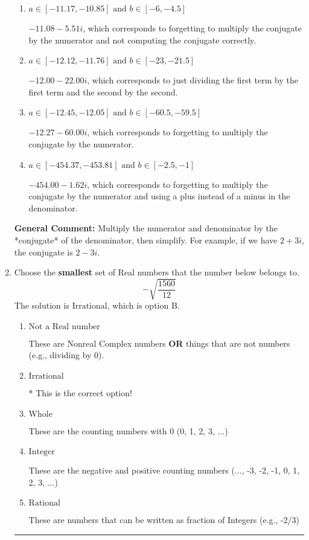 \documentclass{extbook}[14pt]
\newcommand{\litem}[1]{\item #1

\rule{\textwidth}{0.4pt}}
\begin{document}
\begin{enumerate}
{\begin{enumerate}[label=\Alph*.]
* $-12.27  - 1.62 i$, which is the correct option.
\item \( a \in [-11.17, -10.85] \text{ and } b \in [-6, -4.5] \)

 $-11.08  - 5.51 i$, which corresponds to forgetting to multiply the conjugate by the numerator and not computing the conjugate correctly.
\item \( a \in [-12.12, -11.76] \text{ and } b \in [-23, -21.5] \)

 $-12.00  - 22.00 i$, which corresponds to just dividing the first term by the first term and the second by the second.
\item \( a \in [-12.45, -12.05] \text{ and } b \in [-60.5, -59.5] \)

 $-12.27  - 60.00 i$, which corresponds to forgetting to multiply the conjugate by the numerator.
\item \( a \in [-454.37, -453.81] \text{ and } b \in [-2.5, -1] \)

 $-454.00  - 1.62 i$, which corresponds to forgetting to multiply the conjugate by the numerator and using a plus instead of a minus in the denominator.
\end{enumerate}

\textbf{General Comment:} Multiply the numerator and denominator by the *conjugate* of the denominator, then simplify. For example, if we have $2+3i$, the conjugate is $2-3i$.
}
\litem{
Choose the \textbf{smallest} set of Real numbers that the number below belongs to.
\[ -\sqrt{\frac{1560}{12}} \]The solution is \( \text{Irrational} \), which is option B.\begin{enumerate}[label=\Alph*.]
\item \( \text{Not a Real number} \)

These are Nonreal Complex numbers \textbf{OR} things that are not numbers (e.g., dividing by 0).
\item \( \text{Irrational} \)

* This is the correct option!
\item \( \text{Whole} \)

These are the counting numbers with 0 (0, 1, 2, 3, ...)
\item \( \text{Integer} \)

These are the negative and positive counting numbers (..., -3, -2, -1, 0, 1, 2, 3, ...)
\item \( \text{Rational} \)

These are numbers that can be written as fraction of Integers (e.g., -2/3)
\end{enumerate}

}
\end{enumerate}
\end{document}
